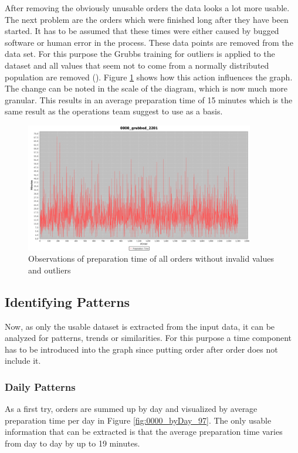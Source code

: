 After removing the obviously unusable orders the data looks a lot more usable. The next problem are the orders which were finished long after they have been started. It has to be assumed that these times were either caused by bugged software or human error in the process. These data points are removed from the data set. For this purpose the Grubbs training for outliers is applied to the dataset and all values that seem not to come from a normally distributed population are removed (\cite{Grubbs}). Figure \ref{fig:0000_grubbed_2201} shows how this action influences the graph. The change can be noted in the scale of the diagram, which is now much more granular. This results in an average preparation time of 15 minutes which is the same result as the operations team suggest to use as a basis.

\begin{figure}[h]
\begin{center}
\includegraphics[width=10cm]{images/0000_grubbed_2201.png}
\caption{Observations of preparation time of all orders without invalid values and outliers}
\label{fig:0000_grubbed_2201}
\end{center}
\end{figure}


\subsection{Identifying Patterns}
Now, as only the usable dataset is extracted from the input data, it can be analyzed for patterns, trends or similarities. For this purpose a time component has to be introduced into the graph since putting order after order does not include it.
\subsubsection{Daily Patterns}
As a first try, orders are summed up by day and visualized by average preparation time per day in Figure \ref{fig:0000_byDay_97}. The only usable information that can be extracted is that the average preparation time varies from day to day by up to 19 minutes.

